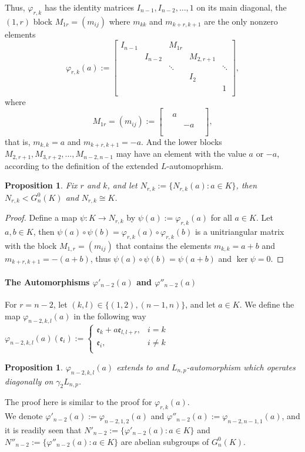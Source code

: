 \documentclass{article}
\newtheorem{proposition}[theorem]{Proposition}
\newcommand{\e}{\mathfrak{e}}
\begin{document}
Thus, $\varphi_{r,k}$ has the identity matrices $I_{n-1},I_{n-2},\dots,1$ on its main diagonal, the $(1,r)$ block $M_{1r}=(m_{ij})$ where $m_{kk}$ and $m_{k+r,k+1}$ are the only nonzero elements
\[\varphi_{r,k}(a):=\begin{bmatrix}
    I_{n-1} &  & M_{1r} & & \\
     & I_{n-2} &  & M_{2,r+1} & \\
     & & \ddots & & \ddots \\
          & & & I_2 & \\
               & & & & 1\\
\end{bmatrix},\]
where
\[
M_{1r}=(m_{ij}):=\begin{bmatrix}
    & & &\\
    & a & &\\
    & & &\\
    & & -a &\\
    & & &\\
\end{bmatrix},
\]
that is, $m_{k,k}=a$ and $m_{k+r,k+1}=-a$.
And the lower blocks $M_{2,r+1},M_{3,r+2},\dots,M_{n-2,n-1}$ may have an element with the value $a$ or $-a$, according to the definition of the extended ${L}$-automoprhism.
\begin{proposition}
Fix $r$ and $k$, and let $N_{r,k}:=\{N_{r,k}(a) : a\in{K}\}$, then $N_{r,k}<G_n^0(K)$ and $N_{r,k}\cong{K}$.
\end{proposition}
\begin{proof}
Define a map $\psi:K\rightarrow{N}_{r,k}$ by $\psi(a):=\varphi_{r,k}(a)$ for all $a\in{K}$.
Let $a,b\in{K}$, then $\psi(a)\circ\psi(b)=\varphi_{r,k}(a)\circ\varphi_{r,k}(b)$ is a unitriangular matrix with the block $M_{1,r}=(m_{ij})$ that contains the elements $m_{k,k}=a+b$ and $m_{k+r,k+1}=-(a+b)$, thus $\psi(a)\circ\psi(b)=\psi(a+b)$ and $\ker\psi=0$. 
\end{proof}

\paragraph{The Automorphisms $\varphi'_{n-2}(a)$ and $\varphi''_{n-2}(a)$}
For $r=n-2$, let $(k,l)\in\{(1,2),(n-1,n)\}$, and let $a\in{K}$. We define the map $\varphi_{n-2,k,l}(a)$ in the following way\\
$\varphi_{n-2,k,l}(a)(\e_i):=\begin{cases}
\e_k+a\e_{l,l+r},&i=k\\
\e_i,&i\neq{k}\\
\end{cases}$
\begin{proposition}
$\varphi_{n-2,k,l}(a)$ extends to and ${L}_{n,p}$-automorphism which operates diagonally on $\gamma_2{L}_{n,p}$.
\end{proposition}
The proof here is similar to the proof for $\varphi_{r,k}(a)$.\\
We denote $\varphi'_{n-2}(a):=\varphi_{n-2,1,2}(a)$ and $\varphi''_{n-2}(a):=\varphi_{n-2,n-1,1}(a)$, and it is readily seen that $N'_{n-2}:=\{\varphi'_{n-2}(a) : a\in{K}\}$ and $N''_{n-2}:=\{\varphi''_{n-2}(a) : a\in{K}\}$ are abelian subgroups of $G_n^0(K)$.
\end{document}
